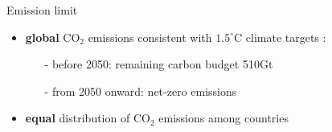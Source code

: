 \documentclass[11pt,aspectratio=169]{beamer}
\begin{document}
\addtocounter{framenumber}{-1}
\begin{frame}{Emission limit}
	\vspace{-1mm}
	\begin{itemize}
		\item  \textbf{global} CO$_2$ emissions consistent with $1.5^\circ$C climate targets \footnotesize{\citep{IPCC2022}}\normalsize :
		\vspace{1mm}
		\begin{itemize}
			\item[-] before 2050: remaining carbon budget 510Gt
			\item[-] from 2050 onward: net-zero  emissions
		\end{itemize}
		\vspace{0mm}
		\item \normalsize{\textbf{equal} distribution of  CO$_2$ emissions among countries }
	\end{itemize}
	\vspace{-2mm}
	

\end{frame}
\end{document}
